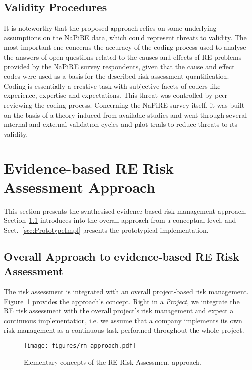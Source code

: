 \documentclass[lnbip]{svmultln}
\begin{document}
\subsection{Validity Procedures}
It is noteworthy that the proposed approach relies on some underlying assumptions on the NaPiRE data, which could represent threats to validity. The most important one concerns the accuracy of the coding process used to analyse the answers of open questions related to the causes and effects of RE problems provided by the NaPiRE survey respondents, given that the cause and effect codes were used as a basis for the described risk assessment quantification. Coding is essentially a creative task with subjective facets of coders like experience, expertise and expectations. This threat was controlled by peer-reviewing the coding process. Concerning the NaPiRE survey itself, it was built on the basis of a theory induced from available studies and went through several internal and external validation cycles and pilot trials to reduce threats to its validity.


\section{Evidence-based RE Risk Assessment Approach}
\label{sec:EbRE}
This section presents the synthesised evidence-based risk management approach. Section~\ref{sec:OVerallConcept} introduces into the overall approach from a conceptual level, and Sect.~\ref{sec:PrototypeImpl} presents the prototypical implementation.

\subsection{Overall Approach to evidence-based RE Risk Assessment}
\label{sec:OVerallConcept}

The risk assessment is integrated with an overall project-based risk management. Figure~\ref{fig:RMApproach} provides the approach's concept. Right in a \emph{Project}, we integrate the RE risk assessment with the overall project's risk management and expect a continuous implementation, i.e. we assume that a company implements its own risk management as a continuous task performed throughout the whole project.
\begin{figure}[!hbtp]
\centering
  \texttt{[image: figures/rm-approach.pdf]}\\
  \caption{Elementary concepts of the RE Risk Assessment approach.}
  \label{fig:RMApproach}
\end{figure} 
\end{document}
